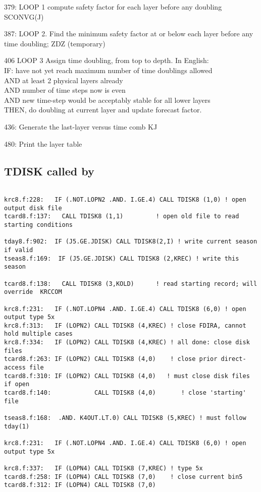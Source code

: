 \documentclass{article}
\newcommand{\qi}{\\ \hspace*{2.em}}      %
\begin{document}
379: LOOP 1 compute safety factor for each layer before any doubling SCONVG(J)

387: LOOP 2. Find the minimum safety factor at or below each layer before any
time doubling; ZDZ (temporary)

406 LOOP 3 Assign time doubling, from top to depth. In English: 
\qi IF:  have not yet reach maximum number of time doublings allowed 
\qi AND at least 2 physical layers already 
\qi AND number of time steps now is even
\qi AND new time-step would be acceptably stable for all lower layers
\\ THEN, do doubling at current layer and update forecast factor.

436: Generate the last-layer versus time comb KJ

480: Print the layer table

\subsection {TDISK called by}
\begin{verbatim}

krc8.f:228:   IF (.NOT.LOPN2 .AND. I.GE.4) CALL TDISK8 (1,0) ! open output disk file   
tcard8.f:137:   CALL TDISK8 (1,1)         ! open old file to read starting conditions

tday8.f:902:  IF (J5.GE.JDISK) CALL TDISK8(2,I) ! write current season if valid
tseas8.f:169:  IF (J5.GE.JDISK) CALL TDISK8 (2,KREC) ! write this season

tcard8.f:138:   CALL TDISK8 (3,KOLD)      ! read starting record; will override  KRCCOM

krc8.f:231:   IF (.NOT.LOPN4 .AND. I.GE.4) CALL TDISK8 (6,0) ! open output type 5x
krc8.f:313:   IF (LOPN2) CALL TDISK8 (4,KREC) ! close FDIRA, cannot hold multiple cases
krc8.f:334:   IF (LOPN2) CALL TDISK8 (4,KREC) ! all done: close disk files
tcard8.f:263: IF (LOPN2) CALL TDISK8 (4,0)    ! close prior direct-access file
tcard8.f:310: IF (LOPN2) CALL TDISK8 (4,0)   ! must close disk files if open
tcard8.f:140:            CALL TDISK8 (4,0)       ! close 'starting' file

tseas8.f:168:  .AND. K4OUT.LT.0) CALL TDISK8 (5,KREC) ! must follow tday(1)
 
krc8.f:231:   IF (.NOT.LOPN4 .AND. I.GE.4) CALL TDISK8 (6,0) ! open output type 5x

krc8.f:337:   IF (LOPN4) CALL TDISK8 (7,KREC) ! type 5x
tcard8.f:258: IF (LOPN4) CALL TDISK8 (7,0)    ! close current bin5
tcard8.f:312: IF (LOPN4) CALL TDISK8 (7,0)    

\end{verbatim} 
\end{document}
